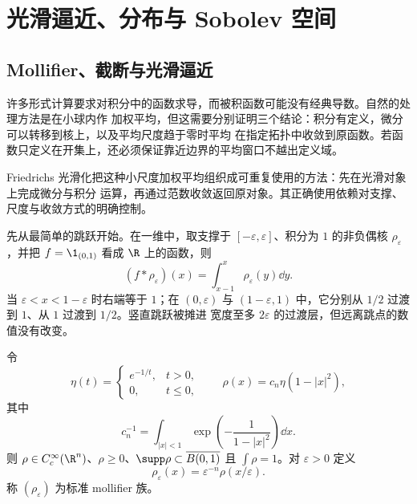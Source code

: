 \section{光滑逼近、分布与 Sobolev 空间}\label{sec:04-03}

\subsection{Mollifier、截断与光滑逼近}\label{subsec:4-3-1}

许多形式计算要求对积分中的函数求导，而被积函数可能没有经典导数。自然的处理方法是在小球内作
加权平均，但这需要分别证明三个结论：积分有定义，微分可以转移到核上，以及平均尺度趋于零时平均
在指定拓扑中收敛到原函数。若函数只定义在开集上，还必须保证靠近边界的平均窗口不越出定义域。

Friedrichs 光滑化把这种小尺度加权平均组织成可重复使用的方法：先在光滑对象上完成微分与积分
运算，再通过范数收敛返回原对象。其正确使用依赖对支撑、尺度与收敛方式的明确控制。

先从最简单的跳跃开始。在一维中，取支撑于
$[-\varepsilon,\varepsilon]$、积分为 $1$ 的非负偶核 $\rho_\varepsilon$，并把
$f=\1_{(0,1)}$ 看成 $\R$ 上的函数，则
\begin{equation}\label{eq:4-3-step-mollification}
 (f*\rho_\varepsilon)(x)
 =\int_{x-1}^{x}\rho_\varepsilon(y)\dd y.
\end{equation}
当 $\varepsilon<x<1-\varepsilon$ 时右端等于 $1$；在 $(0,\varepsilon)$ 与
$(1-\varepsilon,1)$ 中，它分别从 $1/2$ 过渡到 $1$、从 $1$ 过渡到 $1/2$。竖直跳跃被摊进
宽度至多 $2\varepsilon$ 的过渡层，但远离跳点的数值没有改变。

\begin{definition}[标准 mollifier]\label{def:4-3-1-1}
令
\[
 \eta(t)=
 \begin{cases}e^{-1/t},&t>0,\\0,&t\leq0,
 \end{cases}
 \qquad
 \rho(x)=c_n\eta(1-|x|^2),
\]
其中
\[
 c_n^{-1}=\int_{|x|<1}\exp\!\left(-\frac1{1-|x|^2}\right)\dd x.
\]
则 $\rho\in C_c^\infty(\R^n)$、$\rho\geq0$、$\supp\rho\subset\overline{B(0,1)}$ 且
$\int\rho=1$。对 $\varepsilon>0$ 定义
\[
 \rho_\varepsilon(x)=\varepsilon^{-n}\rho(x/\varepsilon).
\]
称 $(\rho_\varepsilon)$ 为标准 mollifier 族。
\end{definition}

